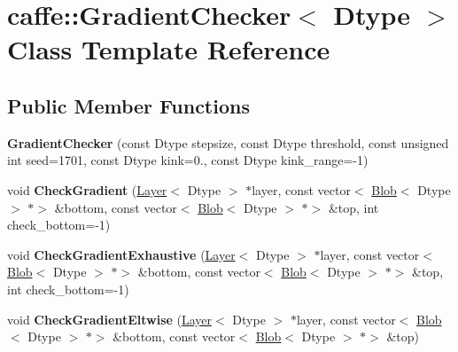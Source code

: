 \hypertarget{classcaffe_1_1_gradient_checker}{}\section{caffe\+:\+:Gradient\+Checker$<$ Dtype $>$ Class Template Reference}
\label{classcaffe_1_1_gradient_checker}
\subsection*{Public Member Functions}
\begin{DoxyCompactItemize}
\item 
\mbox{\label{classcaffe_1_1_gradient_checker_a3669e5cf7ba11ee6858f628f7409fbdc}} 
{\bfseries Gradient\+Checker} (const Dtype stepsize, const Dtype threshold, const unsigned int seed=1701, const Dtype kink=0., const Dtype kink\+\_\+range=-\/1)
\item 
\mbox{\label{classcaffe_1_1_gradient_checker_adaf5d466ad7e96ec277e7a98ec8b8e68}} 
void {\bfseries Check\+Gradient} (\mbox{\hyperlink{classcaffe_1_1_layer}{Layer}}$<$ Dtype $>$ $\ast$layer, const vector$<$ \mbox{\hyperlink{classcaffe_1_1_blob}{Blob}}$<$ Dtype $>$ $\ast$$>$ \&bottom, const vector$<$ \mbox{\hyperlink{classcaffe_1_1_blob}{Blob}}$<$ Dtype $>$ $\ast$$>$ \&top, int check\+\_\+bottom=-\/1)
\item 
\mbox{\label{classcaffe_1_1_gradient_checker_ae485f015c92c3617e8ed2344ca95c347}} 
void {\bfseries Check\+Gradient\+Exhaustive} (\mbox{\hyperlink{classcaffe_1_1_layer}{Layer}}$<$ Dtype $>$ $\ast$layer, const vector$<$ \mbox{\hyperlink{classcaffe_1_1_blob}{Blob}}$<$ Dtype $>$ $\ast$$>$ \&bottom, const vector$<$ \mbox{\hyperlink{classcaffe_1_1_blob}{Blob}}$<$ Dtype $>$ $\ast$$>$ \&top, int check\+\_\+bottom=-\/1)
\item 
\mbox{\label{classcaffe_1_1_gradient_checker_a0f54fe63f95aa3d1687219097332278b}} 
void {\bfseries Check\+Gradient\+Eltwise} (\mbox{\hyperlink{classcaffe_1_1_layer}{Layer}}$<$ Dtype $>$ $\ast$layer, const vector$<$ \mbox{\hyperlink{classcaffe_1_1_blob}{Blob}}$<$ Dtype $>$ $\ast$$>$ \&bottom, const vector$<$ \mbox{\hyperlink{classcaffe_1_1_blob}{Blob}}$<$ Dtype $>$ $\ast$$>$ \&top)

\end{DoxyCompactItemize}
